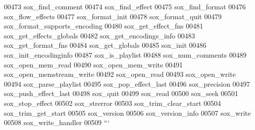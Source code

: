 \begin{DoxyCode}
00473 \textcolor{stringliteral}{sox\_find\_comment}
00474 \textcolor{stringliteral}{sox\_find\_effect}
00475 \textcolor{stringliteral}{sox\_find\_format}
00476 \textcolor{stringliteral}{sox\_flow\_effects}
00477 \textcolor{stringliteral}{sox\_format\_init}
00478 \textcolor{stringliteral}{sox\_format\_quit}
00479 \textcolor{stringliteral}{sox\_format\_supports\_encoding}
00480 \textcolor{stringliteral}{sox\_get\_effect\_fns}
00481 \textcolor{stringliteral}{sox\_get\_effects\_globals}
00482 \textcolor{stringliteral}{sox\_get\_encodings\_info}
00483 \textcolor{stringliteral}{sox\_get\_format\_fns}
00484 \textcolor{stringliteral}{sox\_get\_globals}
00485 \textcolor{stringliteral}{sox\_init}
00486 \textcolor{stringliteral}{sox\_init\_encodinginfo}
00487 \textcolor{stringliteral}{sox\_is\_playlist}
00488 \textcolor{stringliteral}{sox\_num\_comments}
00489 \textcolor{stringliteral}{sox\_open\_mem\_read}
00490 \textcolor{stringliteral}{sox\_open\_mem\_write}
00491 \textcolor{stringliteral}{sox\_open\_memstream\_write}
00492 \textcolor{stringliteral}{sox\_open\_read}
00493 \textcolor{stringliteral}{sox\_open\_write}
00494 \textcolor{stringliteral}{sox\_parse\_playlist}
00495 \textcolor{stringliteral}{sox\_pop\_effect\_last}
00496 \textcolor{stringliteral}{sox\_precision}
00497 \textcolor{stringliteral}{sox\_push\_effect\_last}
00498 \textcolor{stringliteral}{sox\_quit}
00499 \textcolor{stringliteral}{sox\_read}
00500 \textcolor{stringliteral}{sox\_seek}
00501 \textcolor{stringliteral}{sox\_stop\_effect}
00502 \textcolor{stringliteral}{sox\_strerror}
00503 \textcolor{stringliteral}{sox\_trim\_clear\_start}
00504 \textcolor{stringliteral}{sox\_trim\_get\_start}
00505 \textcolor{stringliteral}{sox\_version}
00506 \textcolor{stringliteral}{sox\_version\_info}
00507 \textcolor{stringliteral}{sox\_write}
00508 \textcolor{stringliteral}{sox\_write\_handler}
00509 \textcolor{stringliteral}{```}
\end{DoxyCode}
